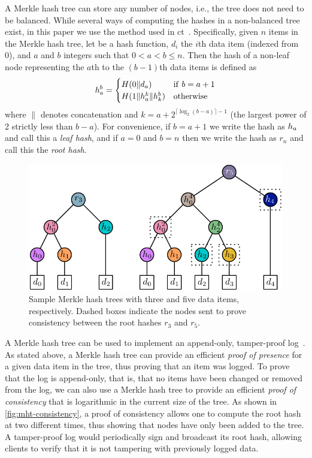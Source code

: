 A Merkle hash tree can store any number of nodes, i.e., the tree does not need
to be balanced. While several ways of computing the hashes in a non-balanced
tree exist, in this paper we use the method used in \ac{ct}~\cite{rfc6962}.
Specifically, given $n$ items in the Merkle hash tree, let \hashfunc be a hash
function, $d_i$ the $i$th data item (indexed from 0), and $a$ and $b$ integers
such that $0 < a < b \le n$. Then the hash of a non-leaf node representing the
$a$th to the $(b-1)$th data items is defined as
\begin{equation}
  h_a^b =
  \begin{cases}
    H(0 \| d_a) & \mathrm{if\ } b = a + 1 \\
    H(1 \| h_a^k \| h_k^b) & \mathrm{otherwise}
  \end{cases}
\end{equation}
where $\|$ denotes concatenation and $k = a + 2^{\lceil \log_2(b-a) \rceil - 1}$
(the largest power of 2 strictly less than $b - a$). For convenience, if $b = a
+ 1$ we write the hash as $h_a$ and call this a \emph{leaf hash}, and if
$a = 0$ and $b = n$ then we write the hash as $r_n$ and call this the \emph{root
hash}.

\begin{figure}
  \centering
  \includegraphics[width=\linewidth]{fig/mht-consistency}
  \caption{Sample Merkle hash trees with three and five data items,
  respectively. Dashed boxes indicate the nodes sent to prove consistency
between the root hashes $r_3$ and $r_5$.}
  \label{fig:mht-consistency}
\end{figure}

A Merkle hash tree can be used to implement an append-only, tamper-proof
log~\cite{crosby2009efficient}. As stated above, a Merkle hash tree can provide
an efficient \emph{proof of presence} for a given data item in the tree, thus
proving that an item was logged. To prove that the log is append-only, that is,
that no items have been changed or removed from the log, we can also use a
Merkle hash tree to provide an efficient \emph{proof of consistency} that is
logarithmic in the current size of the tree. As shown in
\autoref{fig:mht-consistency}, a proof of consistency allows one to compute the
root hash at two different times, thus showing that nodes have only been added
to the tree. A tamper-proof log would periodically sign and broadcast its root
hash, allowing clients to verify that it is not tampering with previously logged
data.

